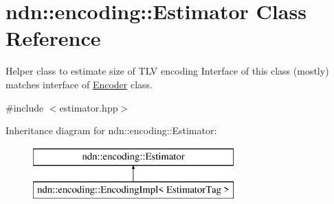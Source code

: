 \hypertarget{classndn_1_1encoding_1_1Estimator}{}\section{ndn\+:\+:encoding\+:\+:Estimator Class Reference}
\label{classndn_1_1encoding_1_1Estimator}


Helper class to estimate size of T\+LV encoding Interface of this class (mostly) matches interface of \hyperlink{classndn_1_1encoding_1_1Encoder}{Encoder} class.  




{\ttfamily \#include $<$estimator.\+hpp$>$}

Inheritance diagram for ndn\+:\+:encoding\+:\+:Estimator\+:\begin{figure}[H]
\begin{center}
\leavevmode
\includegraphics[height=2.000000cm]{classndn_1_1encoding_1_1Estimator}
\end{center}
\end{figure}
